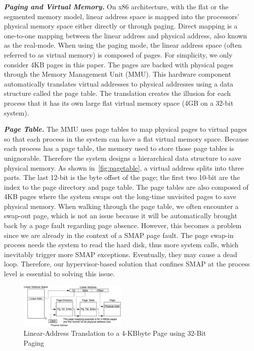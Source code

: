 \textbf{\textit{Paging and Virtual Memory.}} On x86 architecture, with the flat or the segmented memory model, linear address space is mapped into the processors' physical memory space either directly or through paging.  Direct mapping is a one-to-one mapping between the linear address and physical address, also known as the real-mode. When using the paging mode, the linear address space (often referred to as virtual memory) is composed of pages. For simplicity, we only consider 4KB pages in this paper. The pages are backed with physical pages through the Memory Management Unit (MMU). This hardware component automatically translates virtual addresses to physical addresses using a data structure called the page table. The translation creates the illusion for each process that it has its own large flat virtual memory space (4GB on a 32-bit system).



\textbf{\textit{Page Table.}} The MMU uses page tables to map physical pages to virtual pages~\cite{intelpaging} so that each process in the system can have a flat virtual memory space. Because each process has a page table, the memory used to store those page tables is unignorable. Therefore the system designs a hierarchical data structure to save physical memory. As shown in~\autoref{fig:pagetable}, a virtual address splits into three parts. The last 12-bit is the byte offset of the page;  the first two 10-bit are the index to the page directory and page table. The page tables are also composed of 4KB pages where the system swaps out the long-time unvisited pages to save physical memory. When walking through the page table, we often encounter a swap-out page, which is not an issue because it will be automatically brought back by a page fault regarding page absence. However, this becomes a problem since we are already in the context of a SMAP page fault. The page swap-in process needs the system to read the hard disk, thus more system calls, which inevitably trigger more SMAP exceptions. Eventually, they may cause a dead loop. Therefore, our hypervisor-based solution that confines SMAP at the process level is essential to solving this issue.


\begin{figure}[th]
  \includegraphics[width=0.47\textwidth]{figures/pagetable}
  \centering
  \caption{Linear-Address Translation to a 4-KBbyte Page using 32-Bit Paging~\cite{intelpaging}}
  \label{fig:pagetable}
\end{figure}



